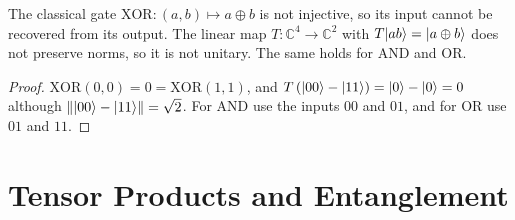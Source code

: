 \begin{lemma}\label{lem:xor-0915}
    The classical gate $\mathrm{XOR} \colon (a, b) \mapsto a \oplus b$ is not injective, so its
    input cannot be recovered from its output. The linear map
    $T \colon \mathbb{C}^4 \to \mathbb{C}^2$ with $T \lvert a b \rangle = \lvert a \oplus b \rangle$ does not preserve
    norms, so it is not unitary. The same holds for AND and OR.
\end{lemma}

\begin{proof}
    $\mathrm{XOR}(0,0) = 0 = \mathrm{XOR}(1,1)$, and
    $T\left(\lvert 00 \rangle - \lvert 11 \rangle\right) = \lvert 0 \rangle - \lvert 0 \rangle = 0$ although
    $\left\lVert \lvert 00 \rangle - \lvert 11 \rangle \right\rVert = \sqrt{2}$. For AND use the inputs $00$ and $01$, and for OR use
    $01$ and $11$.
\end{proof}


\section{Tensor Products and Entanglement}

